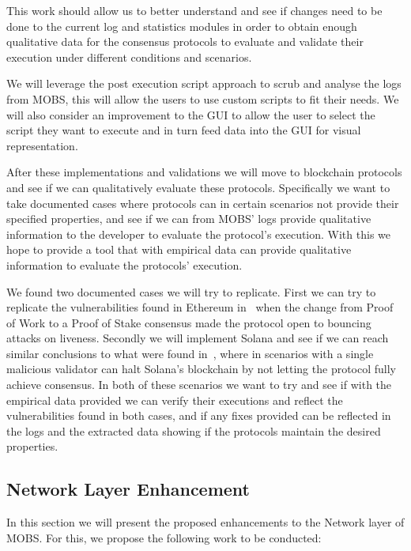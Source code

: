 This work should allow us to better understand and see if changes
need to be done to the current log and statistics modules in order to obtain enough qualitative
data for the consensus protocols to evaluate and validate their execution under different
conditions and scenarios.

We will leverage the post execution script approach to scrub and analyse the logs from MOBS,
this will allow the users to use custom scripts to fit their needs. We will also consider an
improvement to the GUI to allow the user to select the script they want to execute and in turn
feed data into the GUI for visual representation.

After these implementations and validations we will move to blockchain protocols and see
if we can qualitatively evaluate these protocols. Specifically we want to take documented cases
where protocols can in certain scenarios not provide their specified properties, and see if
we can from MOBS' logs provide qualitative information to the developer to evaluate
the protocol's execution. With this we hope to provide a tool that with empirical data can
provide qualitative information to evaluate the protocols' execution.

We found two documented cases we will try to replicate. First we can try to replicate the 
vulnerabilities found in Ethereum in~\cite{ethereum_analysis} when the change
from Proof of Work to a Proof of Stake consensus made the protocol open to bouncing attacks on liveness.
Secondly we will  implement Solana and see if we can reach similar conclusions to what were 
found in~\cite{solana_halting_problem}, where in scenarios with a single malicious validator
can halt Solana's blockchain by not letting the protocol fully achieve consensus.
In both of these scenarios we want to try and see if with the empirical data provided 
we can verify their executions and reflect the vulnerabilities found in both cases, and if
any fixes provided can be reflected in the logs and the extracted data showing if the protocols
maintain the desired properties.

\subsection{Network Layer Enhancement}\label{subsec:network_layer_enchancement}

In this section we will present the proposed enhancements to the Network layer of
MOBS. For this, we propose the following work to be conducted:

